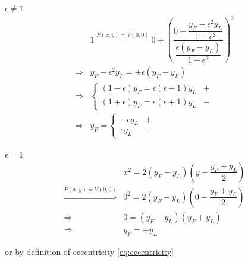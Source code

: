 \documentclass[
]{book}
\theoremstyle{definition}
\theoremstyle{definition}
\theoremstyle{definition}
\theoremstyle{definition}
\theoremstyle{remark}
\begin{document}
\(\epsilon\ne1\)
\[
\begin{aligned}
 & 1\overset{P\left(x,y\right)=V\left(0,0\right)}{=}0+\left(\dfrac{0-\dfrac{y_{{\scriptscriptstyle F}}-\epsilon^{2}y_{{\scriptscriptstyle L}}}{1-\epsilon^{2}}}{\dfrac{\epsilon\left(y_{{\scriptscriptstyle F}}-y_{{\scriptscriptstyle L}}\right)}{1-\epsilon^{2}}}\right)^{2}\\
\Rightarrow & y_{{\scriptscriptstyle F}}-\epsilon^{2}y_{{\scriptscriptstyle L}}=\pm\epsilon\left(y_{{\scriptscriptstyle F}}-y_{{\scriptscriptstyle L}}\right)\\
\Rightarrow & \begin{cases}
\left(1-\epsilon\right)y_{{\scriptscriptstyle F}}=\epsilon\left(\epsilon-1\right)y_{{\scriptscriptstyle L}} & +\\
\left(1+\epsilon\right)y_{{\scriptscriptstyle F}}=\epsilon\left(\epsilon+1\right)y_{{\scriptscriptstyle L}} & -
\end{cases}\\
\Rightarrow & y_{{\scriptscriptstyle F}}=\begin{cases}
-\epsilon y_{{\scriptscriptstyle L}} & +\\
\epsilon y_{{\scriptscriptstyle L}} & -
\end{cases}
\end{aligned}
\]

\(\epsilon=1\)
\[
\begin{aligned}
 & x^{2}=2\left(y_{{\scriptscriptstyle F}}-y_{{\scriptscriptstyle L}}\right)\left(y-\dfrac{y_{{\scriptscriptstyle F}}+y_{{\scriptscriptstyle L}}}{2}\right)\\
\overset{P\left(x,y\right)=V\left(0,0\right)}{\Rightarrow} & 0^{2}=2\left(y_{{\scriptscriptstyle F}}-y_{{\scriptscriptstyle L}}\right)\left(0-\dfrac{y_{{\scriptscriptstyle F}}+y_{{\scriptscriptstyle L}}}{2}\right)\\
\Rightarrow & 0=\left(y_{{\scriptscriptstyle F}}-y_{{\scriptscriptstyle L}}\right)\left(y_{{\scriptscriptstyle F}}+y_{{\scriptscriptstyle L}}\right)\\
\Rightarrow & y_{{\scriptscriptstyle F}}=\mp y_{{\scriptscriptstyle L}}
\end{aligned}
\]

or by definition of eccentricity \eqref{eq:eccentricity}
\end{document}
